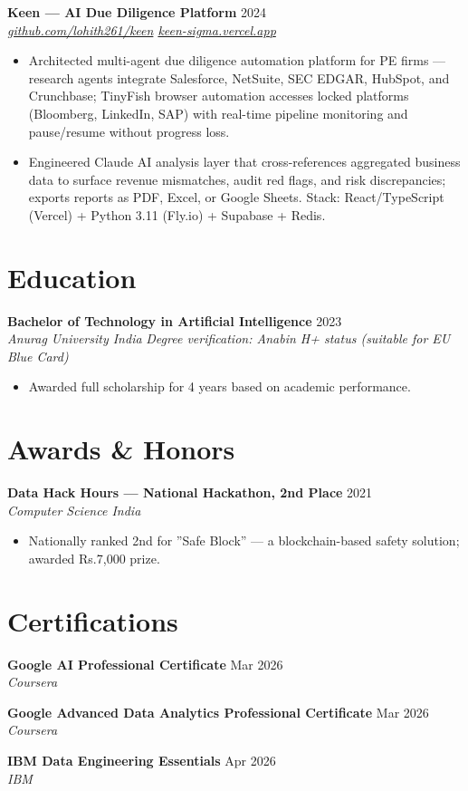 \documentclass[10pt,letterpaper]{article}
\newcommand{\entry}[3]{%
  \vspace{3pt}\textbf{#1} \hfill #3 \\
  \textit{\small #2}\vspace{1pt}}
\begin{document}
\entry{Keen --- AI Due Diligence Platform}{\href{https://github.com/lohith261/keen}{github.com/lohith261/keen} \quad\textbullet\quad \href{https://keen-sigma.vercel.app/}{keen-sigma.vercel.app}}{2024}
\begin{itemize}
  \item Architected multi-agent due diligence automation platform for PE firms --- research agents integrate Salesforce, NetSuite, SEC EDGAR, HubSpot, and Crunchbase; TinyFish browser automation accesses locked platforms (Bloomberg, LinkedIn, SAP) with real-time pipeline monitoring and pause/resume without progress loss.
  \item Engineered Claude AI analysis layer that cross-references aggregated business data to surface revenue mismatches, audit red flags, and risk discrepancies; exports reports as PDF, Excel, or Google Sheets. Stack: React/TypeScript (Vercel) + Python 3.11 (Fly.io) + Supabase + Redis.
\end{itemize}

\section{Education}

\entry{Bachelor of Technology in Artificial Intelligence}{Anurag University \textbullet{} India}{2023}
\newline\textit{\small Degree verification: Anabin H+ status (suitable for EU Blue Card)}
\begin{itemize}
  \item Awarded full scholarship for 4 years based on academic performance.
\end{itemize}

\section{Awards \& Honors}

\textbf{Data Hack Hours --- National Hackathon, 2nd Place} \hfill 2021 \\
\textit{Computer Science India}
\begin{itemize}
  \item Nationally ranked 2nd for ''Safe Block'' --- a blockchain-based safety solution; awarded Rs.7,000 prize.
\end{itemize}

\section{Certifications}

\textbf{Google AI Professional Certificate} \hfill Mar 2026 \\
\textit{Coursera}

\textbf{Google Advanced Data Analytics Professional Certificate} \hfill Mar 2026 \\
\textit{Coursera}

\textbf{IBM Data Engineering Essentials} \hfill Apr 2026 \\
\textit{IBM}
\end{document}
